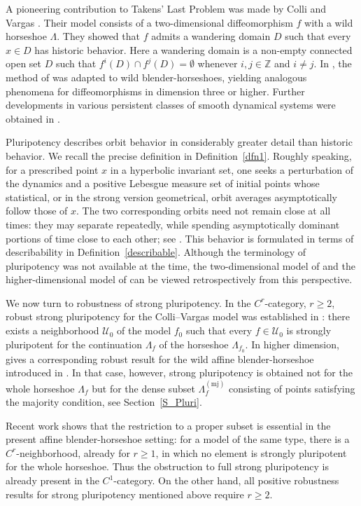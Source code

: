 \documentclass{amsart}
\theoremstyle{plain}
\theoremstyle{definition}
\numberwithin{equation}{section}
\numberwithin{figure}{section}
\begin{document}
A pioneering contribution to Takens' Last Problem was made by Colli and
Vargas \cite{CV01}. Their model consists of a two-dimensional diffeomorphism
$f$ with a wild horseshoe $\Lambda$. They showed that $f$ admits a wandering
domain $D$ such that every $x\in D$ has historic behavior. Here a wandering
domain is a non-empty connected open set $D$ such that
$f^{i}(D)\cap f^{j}(D)=\emptyset$ whenever $i,j\in\mathbb{Z}$ and $i\neq j$.
In \cite{KNS23}, the method of \cite{CV01} was adapted to wild
blender-horseshoes, yielding analogous phenomena for diffeomorphisms in
dimension three or higher. Further developments in various persistent
classes of smooth dynamical systems were obtained in
\cite{KS17,LR17,B22,BB23,JM24}.

Pluripotency describes orbit behavior in considerably greater detail than
historic behavior. We recall the precise definition in
Definition~\ref{dfn1}. Roughly speaking, for a prescribed point $x$ in a
hyperbolic invariant set, one seeks a perturbation of the dynamics and a
positive Lebesgue measure set of initial points whose statistical, or in the
strong version geometrical, orbit averages asymptotically follow those of
$x$. The two corresponding orbits need not remain close at all times: they
may separate repeatedly, while spending asymptotically dominant portions of
time close to each other; see \cite[Proposition~1.3]{KNS}. This behavior is
formulated in terms of describability in Definition~\ref{describable}.
Although the terminology of pluripotency was not available at the time, the
two-dimensional model of \cite{CV01} and the higher-dimensional model of
\cite{KNS23} can be viewed retrospectively from this perspective.

We now turn to robustness of strong pluripotency. In the $C^{r}$-category,
$r\geq 2$, robust strong pluripotency for the Colli--Vargas model was
established in \cite{KLNSV}: there exists a neighborhood $\mathcal{U}_{0}$
of the model $f_{0}$ such that every $f\in\mathcal{U}_{0}$ is strongly
pluripotent for the continuation $\Lambda_{f}$ of the horseshoe
$\Lambda_{f_{0}}$. In higher dimension, \cite[Theorem~B]{KNS} gives a
corresponding robust result for the wild affine blender-horseshoe introduced
in \cite{KNS23}. In that case, however, strong pluripotency is obtained not
for the whole horseshoe $\Lambda_{f}$ but for the dense subset
$\Lambda_{f}^{(\mathrm{mj})}$ consisting of points satisfying the majority
condition, see Section~\ref{S_Pluri}.

Recent work \cite{KLNS} shows that the restriction to a proper subset is
essential in the present affine blender-horseshoe setting: for a model of the
same type, there is a $C^{r}$-neighborhood, already for $r\geq 1$, in which
no element is strongly pluripotent for the whole horseshoe. Thus the
obstruction to full strong pluripotency is already present in the
$C^{1}$-category. On the other hand, all positive robustness results for
strong pluripotency mentioned above require $r\geq 2$.
\end{document}
